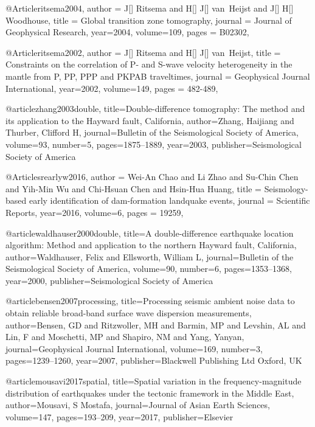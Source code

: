 @Article{ritsema2004,
  author =	 {J[] Ritsema and H[] J[] van~Heijst and J[] H[] Woodhouse},
  title =	 {Global transition zone tomography},
  journal =	 {Journal of Geophysical Research},
  year=2004,
  volume=109,
  pages =	 {B02302},
}

@Article{ritsema2002,
  author =	 {J[] Ritsema and H[] J[] van~Heijst},
  title =	 {Constraints on the correlation of {P}- and {S}-wave velocity heterogeneity in the mantle from {P}, {PP}, {PPP} and {PKPAB} traveltimes},
  journal =	 {Geophysical Journal International},
  year=2002,
  volume=149,
  pages =	 {482-489},
}

@article{zhang2003double,
  title={Double-difference tomography: The method and its application to the Hayward fault, California},
  author={Zhang, Haijiang and Thurber, Clifford H},
  journal={Bulletin of the Seismological Society of America},
  volume={93},
  number={5},
  pages={1875--1889},
  year={2003},
  publisher={Seismological Society of America}
}

@Article{srearlyw2016,
  author =	 {Wei-An Chao and Li Zhao and Su-Chin Chen and Yih-Min Wu and Chi-Hsuan Chen and Hsin-Hua Huang},
  title =	 {Seismology-based early identification of dam-formation landquake events},
  journal =	 {Scientific Reports},
  year=2016,
  volume=6,
  pages =	 {19259},
}


@article{waldhauser2000double,
  title={A double-difference earthquake location algorithm: Method and application to the northern Hayward fault, California},
  author={Waldhauser, Felix and Ellsworth, William L},
  journal={Bulletin of the Seismological Society of America},
  volume={90},
  number={6},
  pages={1353--1368},
  year={2000},
  publisher={Seismological Society of America}
}

@article{bensen2007processing,
  title={Processing seismic ambient noise data to obtain reliable broad-band surface wave dispersion measurements},
  author={Bensen, GD and Ritzwoller, MH and Barmin, MP and Levshin, AL and Lin, F and Moschetti, MP and Shapiro, NM and Yang, Yanyan},
  journal={Geophysical Journal International},
  volume={169},
  number={3},
  pages={1239--1260},
  year={2007},
  publisher={Blackwell Publishing Ltd Oxford, UK}
}

@article{mousavi2017spatial,
  title={Spatial variation in the frequency-magnitude distribution of earthquakes under the tectonic framework in the Middle East},
  author={Mousavi, S Mostafa},
  journal={Journal of Asian Earth Sciences},
  volume={147},
  pages={193--209},
  year={2017},
  publisher={Elsevier}
}

